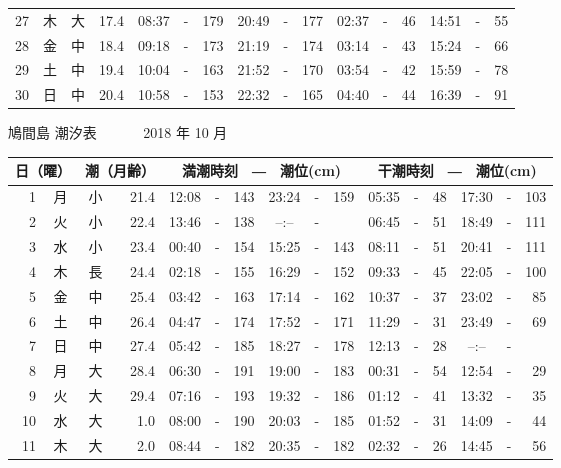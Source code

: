 \documentclass[12pt.a4j]{jsarticle}
\begin{document}
\begin{center}
\begin{table}[ht]
\begin{tabular}{|rc|cr|ccrccr|ccrccr|}
27 & 木 & 大 & 17.4 &  08:37 &-& 179  &  20:49 &-& 177  &   02:37 &-&  46  &   14:51 &-&  55  \\
28 & 金 & 中 & 18.4 &  09:18 &-& 173  &  21:19 &-& 174  &   03:14 &-&  43  &   15:24 &-&  66  \\
29 & 土 & 中 & 19.4 &  10:04 &-& 163  &  21:52 &-& 170  &   03:54 &-&  42  &   15:59 &-&  78  \\
30 & 日 & 中 & 20.4 &  10:58 &-& 153  &  22:32 &-& 165  &   04:40 &-&  44  &   16:39 &-&  91  \\
   \hline
   \end{tabular}
\end{table}
\newpage
 {\LARGE 鳩間島  潮汐表　　　}
 {\large 2018 年 10 月}\\
 \begin{table}[ht]
    \begin{tabular}{|rc|cr|ccrccr|ccrccr|}
    \hline
    \multicolumn{2}{|c|}{日（曜）} & \multicolumn{2}{c|}{潮（月齢）} & \multicolumn{6}{c|}{満潮時刻　―　潮位(cm)} & \multicolumn{6}{c|}{干潮時刻　―　潮位(cm)} \\
 \hline
 1 & 月 & 小 & 21.4 &  12:08 &-& 143  &  23:24 &-& 159  &   05:35 &-&  48  &   17:30 &-& 103  \\
 2 & 火 & 小 & 22.4 &  13:46 &-& 138  &  --:-- &-&     &   06:45 &-&  51  &   18:49 &-& 111  \\
 3 & 水 & 小 & 23.4 &  00:40 &-& 154  &  15:25 &-& 143  &   08:11 &-&  51  &   20:41 &-& 111  \\
 4 & 木 & 長 & 24.4 &  02:18 &-& 155  &  16:29 &-& 152  &   09:33 &-&  45  &   22:05 &-& 100  \\
 5 & 金 & 中 & 25.4 &  03:42 &-& 163  &  17:14 &-& 162  &   10:37 &-&  37  &   23:02 &-&  85  \\
 6 & 土 & 中 & 26.4 &  04:47 &-& 174  &  17:52 &-& 171  &   11:29 &-&  31  &   23:49 &-&  69  \\
 7 & 日 & 中 & 27.4 &  05:42 &-& 185  &  18:27 &-& 178  &   12:13 &-&  28  &   --:-- &-&     \\
 8 & 月 & 大 & 28.4 &  06:30 &-& 191  &  19:00 &-& 183  &   00:31 &-&  54  &   12:54 &-&  29  \\
 9 & 火 & 大 & 29.4 &  07:16 &-& 193  &  19:32 &-& 186  &   01:12 &-&  41  &   13:32 &-&  35  \\
10 & 水 & 大 &  1.0 &  08:00 &-& 190  &  20:03 &-& 185  &   01:52 &-&  31  &   14:09 &-&  44  \\
11 & 木 & 大 &  2.0 &  08:44 &-& 182  &  20:35 &-& 182  &   02:32 &-&  26  &   14:45 &-&  56  \\

\end{tabular}
\end{table}
\end{center}
\end{document}
